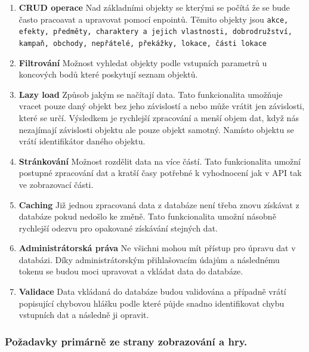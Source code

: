 \begin{enumerate}[label=\textbf{F\arabic*}:, leftmargin=*, align=left]
    \item \textbf{CRUD operace} Nad základními objekty se kterými se počítá že se bude často pracoavat a upravovat pomocí enpointů. Těmito objekty jsou \texttt{akce, efekty, předměty, charaktery a jejich vlastnosti, dobrodružství, kampaň, obchody, nepřátelé, překážky, lokace, části lokace}
    \item \textbf{Filtrování} Možnost vyhledat objekty podle vstupních parametrů u koncových bodů které poskytují seznam objektů.
    \item \textbf{Lazy load} Způsob jakým se načítají data. Tato funkcionalita umožňuje vracet pouze daný objekt bez jeho závislostí a nebo může vrátit jen závislosti, které se určí. Výsledkem je rychlejší zpracování a menší objem dat, když nás nezajímají závislosti objektu ale pouze objekt samotný. Namísto objektu se vrátí identifikátor daného objektu.
    \item \textbf{Stránkování} Možnost rozdělit data na více částí. Tato funkcionalita umožní postupné zpracování dat a kratší časy potřebné k vyhodnocení jak v API tak ve zobrazovací části.
    \item \textbf{Caching} Již jednou zpracovaná data z databáze není třeba znovu získávat z databáze pokud nedošlo ke změně. Tato funkcionalita umožní násobně rychlejší odezvu pro opakované získávání stejných dat.
    \item \textbf{Administrátorská práva} Ne všichni mohou mít přístup pro úpravu dat v databázi. Díky administrátorským přihlašovacím údajům a následnému tokenu se budou moci upravovat a vkládat data do databáze.
    \item \textbf{Validace} Data vkládaná do databáze budou validována a případně vrátí popisující chybovou hlášku podle které půjde snadno identifikovat chybu vstupních dat a následně ji opravit.
\end{enumerate}

\subsubsection*{Požadavky primárně ze strany zobrazování a hry.}


